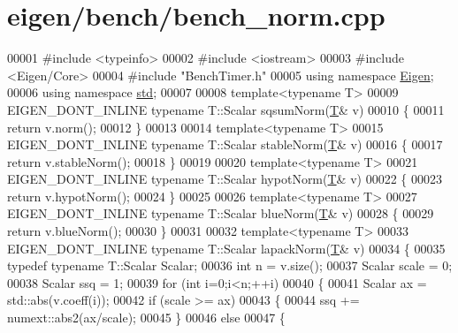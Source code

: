 \hypertarget{eigen_2bench_2bench__norm_8cpp_source}{}\section{eigen/bench/bench\+\_\+norm.cpp}
\label{eigen_2bench_2bench__norm_8cpp_source}

\begin{DoxyCode}
00001 \textcolor{preprocessor}{#include <typeinfo>}
00002 \textcolor{preprocessor}{#include <iostream>}
00003 \textcolor{preprocessor}{#include <Eigen/Core>}
00004 \textcolor{preprocessor}{#include "BenchTimer.h"}
00005 \textcolor{keyword}{using namespace }\hyperlink{namespace_eigen}{Eigen};
00006 \textcolor{keyword}{using namespace }\hyperlink{namespacestd}{std};
00007 
00008 \textcolor{keyword}{template}<\textcolor{keyword}{typename} T>
00009 EIGEN\_DONT\_INLINE \textcolor{keyword}{typename} T::Scalar sqsumNorm(\hyperlink{group___sparse_core___module}{T}& v)
00010 \{
00011   \textcolor{keywordflow}{return} v.norm();
00012 \}
00013 
00014 \textcolor{keyword}{template}<\textcolor{keyword}{typename} T>
00015 EIGEN\_DONT\_INLINE \textcolor{keyword}{typename} T::Scalar stableNorm(\hyperlink{group___sparse_core___module}{T}& v)
00016 \{
00017   \textcolor{keywordflow}{return} v.stableNorm();
00018 \}
00019 
00020 \textcolor{keyword}{template}<\textcolor{keyword}{typename} T>
00021 EIGEN\_DONT\_INLINE \textcolor{keyword}{typename} T::Scalar hypotNorm(\hyperlink{group___sparse_core___module}{T}& v)
00022 \{
00023   \textcolor{keywordflow}{return} v.hypotNorm();
00024 \}
00025 
00026 \textcolor{keyword}{template}<\textcolor{keyword}{typename} T>
00027 EIGEN\_DONT\_INLINE \textcolor{keyword}{typename} T::Scalar blueNorm(\hyperlink{group___sparse_core___module}{T}& v)
00028 \{
00029   \textcolor{keywordflow}{return} v.blueNorm();
00030 \}
00031 
00032 \textcolor{keyword}{template}<\textcolor{keyword}{typename} T>
00033 EIGEN\_DONT\_INLINE \textcolor{keyword}{typename} T::Scalar lapackNorm(\hyperlink{group___sparse_core___module}{T}& v)
00034 \{
00035   \textcolor{keyword}{typedef} \textcolor{keyword}{typename} T::Scalar Scalar;
00036   \textcolor{keywordtype}{int} n = v.size();
00037   Scalar scale = 0;
00038   Scalar ssq = 1;
00039   \textcolor{keywordflow}{for} (\textcolor{keywordtype}{int} i=0;i<n;++i)
00040   \{
00041     Scalar ax = std::abs(v.coeff(i));
00042     \textcolor{keywordflow}{if} (scale >= ax)
00043     \{
00044       ssq += numext::abs2(ax/scale);
00045     \}
00046     \textcolor{keywordflow}{else}
00047     \{

\end{DoxyCode}

